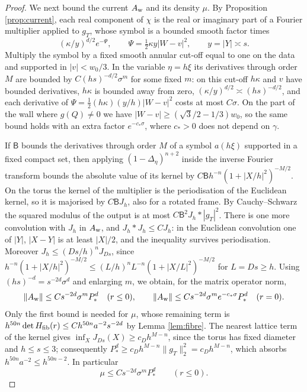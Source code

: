 \begin{proof}
We next bound the current $A_{\rm w}$ and its density $\mu$. By Proposition \ref{prop:current},
each real component of $\chi$ is the real or imaginary part of a Fourier multiplier applied to
$g_T$, whose symbol is a bounded smooth factor times
\[
(\kappa/y)^{d/2}e^{-\Psi},\qquad\Psi=\tfrac12\kappa y|W-v|^2,\qquad y=|Y|\asymp s .
\]
Multiply the symbol by a fixed smooth annular cut-off equal to one on the data and supported in
$|v|<w_0/3$. In the variable $\eta=h\xi$ its derivatives through order $M$ are bounded by
$C(hs)^{-d/2}\sigma^m$ for some fixed $m$: on this cut-off $h\kappa$ and $v$ have bounded
derivatives, $h\kappa$ is bounded away from zero, $(\kappa/y)^{d/2}\asymp(hs)^{-d/2}$, and each
derivative of $\Psi=\frac12(h\kappa)(y/h)|W-v|^2$ costs at most $C\sigma$. On the part of the wall
where $g(Q)\ne0$ we have $|W-v|\ge(\sqrt3/2-1/3)w_0$, so the same bound holds with an extra factor
$e^{-c_*\sigma}$, where $c_*>0$ does not depend on $\gamma$.

If $\mathsf B$ bounds the derivatives through order $M$ of a symbol $a(h\xi)$ supported in a fixed
compact set, then applying $(1-\Delta_\eta)^{n+2}$ inside the inverse Fourier transform bounds the
absolute value of its kernel by $C\mathsf Bh^{-n}(1+|X/h|^2)^{-M/2}$. On the torus the kernel of the
multiplier is the periodisation of the Euclidean kernel, so it is majorised by $C\mathsf BJ_h$, also
for a rotated frame. By Cauchy--Schwarz the squared modulus of the output is at most
$C\mathsf B^2J_h*|g_T|^2$. There is one more convolution with $J_h$ in $A_{\rm w}$, and
$J_h*J_h\le CJ_h$: in the Euclidean convolution one of $|Y|$, $|X-Y|$ is at least $|X|/2$, and the
inequality survives periodisation. Moreover $J_h\le(Ds/h)^nJ_{Ds}$, since
$h^{-n}(1+|X/h|^2)^{-M/2}\le(L/h)^nL^{-n}(1+|X/L|^2)^{-M/2}$ for $L=Ds\ge h$. Using
$(hs)^{-d}=s^{-2d}\sigma^d$ and enlarging $m$, we obtain, for the matrix operator norm,
\begin{equation}\label{eq:Aw}
\|A_{\rm w}\|\le Cs^{-2d}\sigma^mP_*^d\quad(r\le0),\qquad
\|A_{\rm w}\|\le Cs^{-2d}\sigma^me^{-c_*\sigma}P_*^d\quad(r=0).
\end{equation}
Only the first bound is needed for $\mu$, whose remaining term is
$h^{50n}\det H_{\mathrm{fib}}(r)\le Ch^{50n}a^{-2}s^{-2d}$ by Lemma \ref{lem:fibre}. The nearest lattice term of
the kernel gives $\inf_XJ_{Ds}(X)\ge c_Dh^{M-n}$, since the torus has fixed diameter and $h\le s\le3$;
consequently $P_*^d\ge c_Dh^{M-n}\|g_T\|_2^2=c_Dh^{M-n}$, which absorbs $h^{50n}a^{-2}\le h^{50n-2}$.
In particular
\begin{equation}\label{eq:mu}
\mu\le Cs^{-2d}\sigma^mP_*^d\qquad(r\le0).
\end{equation}


\end{proof}
